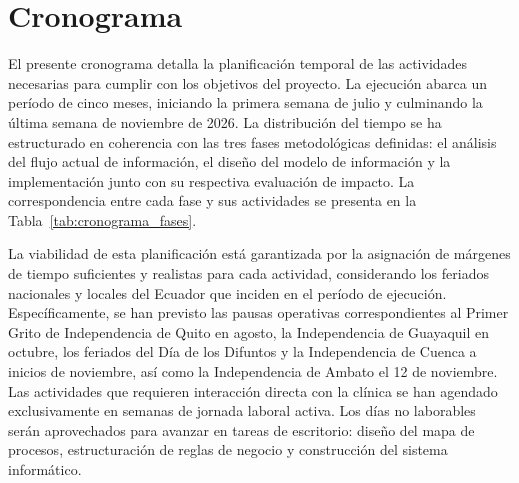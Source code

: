 \section{Cronograma}
El presente cronograma detalla la planificación temporal de las
actividades necesarias para cumplir con los objetivos del proyecto.
La ejecución abarca un período de cinco meses, iniciando la primera
semana de julio y culminando la última semana de noviembre de 2026.
La distribución del tiempo se ha estructurado en coherencia con las
tres fases metodológicas definidas: el análisis del flujo actual de
información, el diseño del modelo de información y la implementación
junto con su respectiva evaluación de impacto. La correspondencia
entre cada fase y sus actividades se presenta en la
Tabla~\ref{tab:cronograma_fases}.

La viabilidad de esta planificación está garantizada por la
asignación de márgenes de tiempo suficientes y realistas para cada
actividad, considerando los feriados nacionales y locales del
Ecuador que inciden en el período de ejecución. Específicamente,
se han previsto las pausas operativas correspondientes al Primer
Grito de Independencia de Quito en agosto, la Independencia de
Guayaquil en octubre, los feriados del Día de los Difuntos y la
Independencia de Cuenca a inicios de noviembre, así como la
Independencia de Ambato el 12 de noviembre. Las actividades que
requieren interacción directa con la clínica se han
agendado exclusivamente en semanas de jornada laboral activa. Los
días no laborables serán aprovechados para avanzar en tareas de
escritorio: diseño del mapa de procesos, estructuración de reglas
de negocio y construcción del sistema informático.


